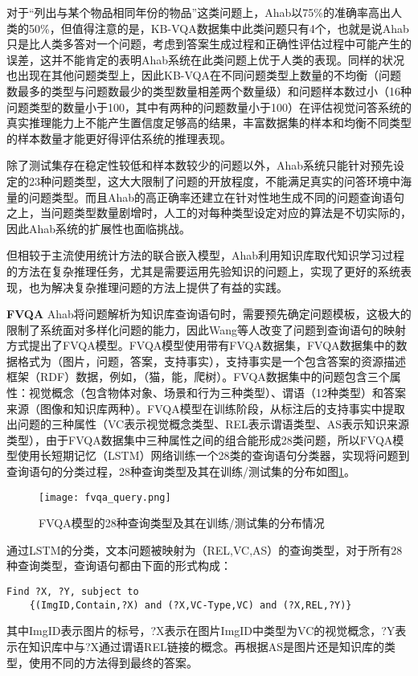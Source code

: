 对于“列出与某个物品相同年份的物品”这类问题上，Ahab以75\%的准确率高出人类的50\%，但值得注意的是，KB-VQA数据集中此类问题只有4个，也就是说Ahab只是比人类多答对一个问题，考虑到答案生成过程和正确性评估过程中可能产生的误差，这并不能肯定的表明Ahab系统在此类问题上优于人类的表现。同样的状况也出现在其他问题类型上，因此KB-VQA在不同问题类型上数量的不均衡（问题数最多的类型与问题数最少的类型数量相差两个数量级）和问题样本数过小（16种问题类型的数量小于100，其中有两种的问题数量小于100）在评估视觉问答系统的真实推理能力上不能产生置信度足够高的结果，丰富数据集的样本和均衡不同类型的样本数量才能更好得评估系统的推理表现。

除了测试集存在稳定性较低和样本数较少的问题以外，Ahab系统只能针对预先设定的23种问题类型，这大大限制了问题的开放程度，不能满足真实的问答环境中海量的问题类型。而且Ahab的高正确率还建立在针对性地生成不同的问题查询语句之上，当问题类型数量剧增时，人工的对每种类型设定对应的算法是不切实际的，因此Ahab系统的扩展性也面临挑战。

但相较于主流使用统计方法的联合嵌入模型，Ahab利用知识库取代知识学习过程的方法在复杂推理任务，尤其是需要运用先验知识的问题上，实现了更好的系统表现，也为解决复杂推理问题的方法上提供了有益的实践。

\textbf{FVQA}
Ahab将问题解析为知识库查询语句时，需要预先确定问题模板，这极大的限制了系统面对多样化问题的能力，因此Wang等人改变了问题到查询语句的映射方式提出了FVQA模型。FVQA模型使用带有FVQA数据集，FVQA数据集中的数据格式为（图片，问题，答案，支持事实），支持事实是一个包含答案的资源描述框架（RDF）数据，例如，（猫，能，爬树）。FVQA数据集中的问题包含三个属性：视觉概念（包含物体对象、场景和行为三种类型）、谓语（12种类型）和答案来源（图像和知识库两种）。FVQA模型在训练阶段，从标注后的支持事实中提取出问题的三种属性（VC表示视觉概念类型、REL表示谓语类型、AS表示知识来源类型），由于FVQA数据集中三种属性之间的组合能形成28类问题，所以FVQA模型使用长短期记忆（LSTM）网络训练一个28类的查询语句分类器，实现将问题到查询语句的分类过程，28种查询类型及其在训练/测试集的分布如图\ref{fvqa_query}。
\begin{figure}[H]
	\centering
	\texttt{[image: fvqa\_query.png]}
	\caption{FVQA模型的28种查询类型及其在训练/测试集的分布情况}
	\label{fvqa_query}
\end{figure}

通过LSTM的分类，文本问题被映射为（REL,VC,AS）的查询类型，对于所有28种查询类型，查询语句都由下面的形式构成：
\begin{verbatim}
Find ?X, ?Y, subject to 
	{(ImgID,Contain,?X) and (?X,VC-Type,VC) and (?X,REL,?Y)}
\end{verbatim}
其中ImgID表示图片的标号，?X表示在图片ImgID中类型为VC的视觉概念，?Y表示在知识库中与?X通过谓语REL链接的概念。再根据AS是图片还是知识库的类型，使用不同的方法得到最终的答案。


